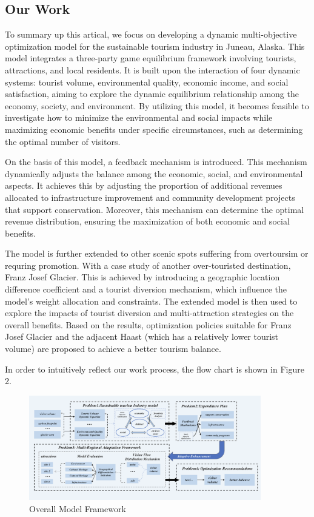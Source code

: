 \documentclass{mcmthesis}
\begin{document}
\subsection{Our Work}
To summary up this artical, we focus on developing a dynamic multi-objective optimization model for the sustainable tourism industry in Juneau, Alaska. 
This model integrates a three-party game equilibrium framework involving tourists, attractions, and local residents. 
It is built upon the interaction of four dynamic systems: tourist volume, environmental quality, economic income, and social satisfaction, 
aiming to explore the dynamic equilibrium relationship among the economy, society, and environment. 
By utilizing this model, it becomes feasible to investigate how to minimize the environmental and social impacts while maximizing economic benefits under specific circumstances,
such as determining the optimal number of visitors.

On the basis of this model, a feedback mechanism is introduced. This mechanism dynamically adjusts the balance among the economic, social, and environmental aspects.
It achieves this by adjusting the proportion of additional revenues allocated to infrastructure improvement and community development projects that support conservation.
Moreover, this mechanism can determine the optimal revenue distribution, ensuring the maximization of both economic and social benefits.

The model is further extended to other scenic spots suffering from overtoursim or requring promotion. With a case study of another over-touristed destination, 
Franz Josef Glacier. This is achieved by introducing a geographic location difference coefficient and a tourist diversion mechanism, which influence the model's weight allocation and constraints.
The extended model is then used to explore the impacts of tourist diversion and multi-attraction strategies on the overall benefits. 
Based on the results, optimization policies suitable for Franz Josef Glacier and the adjacent Haast (which has a relatively lower tourist volume) are proposed to achieve a better tourism balance.

In order to intuitively reflect our work process, the flow chart is shown in Figure 2.

\begin{figure}[H]
  \centering
  \includegraphics[width=0.9\textwidth]{figures/overall_flow.png}
  \caption{Overall Model Framework}
  \label{Fig.2}
\end{figure}
\end{document}
